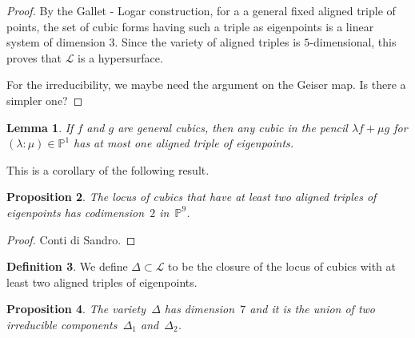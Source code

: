 \documentclass[12pt, a4paper, reqno, captions=tableheading,bibliography=totoc]{scrartcl}
\theoremstyle{plain}
\newtheorem{lemma}{Lemma}[section]
\newtheorem{prop}[lemma]{Proposition}
\theoremstyle{definition}
\newtheorem{definition}[lemma]{Definition}
\newcommand{\p}{\mathbb{P}}
\begin{document}
\begin{proof}
By the Gallet - Logar construction, for a a general fixed aligned triple of points, the set of cubic forms having such a triple as eigenpoints is a linear system of dimension 3. Since the variety of aligned triples is $5$-dimensional, this proves that $\mathcal{L}$ is a hypersurface.

For the irreducibility, we maybe need the argument on the Geiser map. Is there a simpler one?
\end{proof}

\begin{lemma}
\label{lemma:pencil_one_aligned}
 If $f$ and $g$ are general cubics, then any cubic in the pencil $\lambda f + \mu g$ for $(\lambda: \mu) \in \p^1$ has at most one aligned triple of eigenpoints.
\end{lemma}

This is a corollary of the following result.

\begin{prop}
    The locus of cubics that have at least two aligned triples of eigenpoints has codimension~$2$ in~$\p^9$.
\end{prop}
\begin{proof}
    Conti di Sandro.
\end{proof}

\begin{definition}
 We define $\Delta \subset \mathcal{L}$ to be the closure of the locus of cubics with at least two aligned triples of eigenpoints.
\end{definition}

\begin{prop}
  The variety~$\Delta$ has dimension~$7$ and it is the union of two irreducible components~$\Delta_1$ and~$\Delta_2$.
\end{prop}
\end{document}
